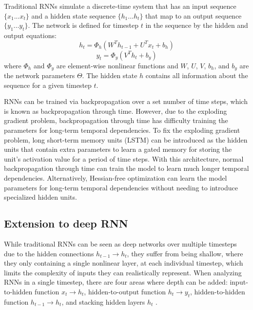 Traditional RNNs simulate a discrete-time system that has an input sequence \(\{x_1...x_t\}\) and a hidden state sequence \(\{h_1...h_t\}\) that map to an output sequence \(\{y_1...y_t\}\). The network is defined for timestep \(t\) in the sequence by the hidden and output equations:
\begin{equation}
	h_t = \Phi_h(W^Th_{t-1} + U^Tx_t + b_h)
\end{equation}
\begin{equation}
	y_t = \Phi_y(V^Th_t + b_y)
\end{equation}
where \(\Phi_h\) and \(\Phi_y\) are element-wise nonlinear functions and \(W\), \(U\), \(V\), \(b_h\), and \(b_y\) are the network parameters \(\Theta\). The hidden state \(h\) contains all information about the sequence for a given timestep \(t\).

RNNs can be trained via backpropagation over a set number of time steps, which is known as backpropagation through time. However, due to the exploding gradient problem, backpropagation through time has difficulty training the parameters for long-term temporal dependencies. To fix the exploding gradient problem, long short-term memory units (LSTM) \cite{lstm} can be introduced as the hidden units that contain extra parameters to learn a gated memory for storing the unit's activation value for a period of time steps. With this architecture, normal backpropagation through time can train the model to learn much longer temporal dependencies. Alternatively, Hessian-free optimization \cite{hessian_free} can learn the model parameters for long-term temporal dependencies without needing to introduce specialized hidden units.

\subsection{Extension to deep RNN}
While traditional RNNs can be seen as deep networks over multiple timesteps due to the hidden connections \(h_{t-1} \rightarrow h_t\), they suffer from being shallow, where they only containing a single nonlinear layer, at each individual timestep, which limits the complexity of inputs they can realistically represent. When analyzing RNNs in a single timestep, there are four areas where depth can be added: input-to-hidden function \(x_t \rightarrow h_t\), hidden-to-output function \(h_t \rightarrow y_t\), hidden-to-hidden function \(h_{t-1} \rightarrow h_t\), and stacking hidden layers \(h_t\) \cite{deep_rnn}.

